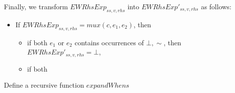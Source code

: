 {Finally, we transform $EWRhsExp_{ss, v, rhs}$ into $EWRhsExp'_{ss, v, rhs}$ as follows:
\begin{itemize}
\item If $EWRhsExp_{ss, v, rhs} = mux(c, e_1, e_2)$, then
\begin{itemize}
\item if both $e_1$ or $e_2$ contains occurrences of $\bot, \sim$, then $EWRhsExp'_{ss, v, rhs} = \bot$,
%
\item if both
\end{itemize}
\end{itemize}

Define a recursive function $expandWhens$
}
